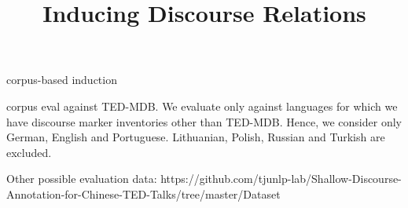\title{Inducing Discourse Relations}

corpus-based induction

corpus eval against TED-MDB. We evaluate only against languages for which we have discourse marker inventories other than TED-MDB. Hence, we consider only German, English and Portuguese. Lithuanian, Polish, Russian and Turkish are excluded.

Other possible evaluation data: https://github.com/tjunlp-lab/Shallow-Discourse-Annotation-for-Chinese-TED-Talks/tree/master/Dataset%
